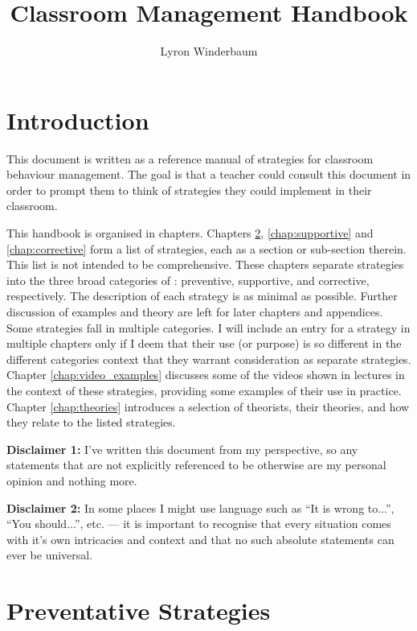 \documentclass[12pt]{report}
\title{Classroom Management Handbook}
\author{Lyron Winderbaum}
\begin{document}
\maketitle

\tableofcontents

\chapter{Introduction}

This document is written as a reference manual of strategies for classroom behaviour management. The goal is that a teacher could consult this document in order to prompt them to think of strategies they could implement in their classroom.

This handbook is organised in chapters. Chapters \ref{chap:preventative}, \ref{chap:supportive} and \ref{chap:corrective} form a list of strategies, each as a section or sub-section therein.
This list is not intended to be comprehensive. These chapters separate strategies into the three broad categories of \cite{Charles2002}: preventive, supportive, and corrective, respectively. The description of each strategy is as minimal as possible. Further discussion of examples and theory are left for later chapters and appendices. Some strategies fall in multiple categories. I will include an entry for a strategy in multiple chapters only if I deem that their use (or purpose) is so different in the different categories context that they warrant consideration as separate strategies. Chapter \ref{chap:video_examples} discusses some of the videos shown in lectures in the context of these strategies, providing some examples of their use in practice. Chapter \ref{chap:theories} introduces a selection of theorists, their theories, and how they relate to the listed strategies.

\textbf{Disclaimer 1:} I've written this document from my perspective, so any statements that are not explicitly referenced to be otherwise are my personal opinion and nothing more.

\textbf{Disclaimer 2:} In some places I might use language such as ``It is wrong to...'', ``You should...'', etc. --- it is important to recognise that every situation comes with it's own intricacies and context and that no such absolute statements can ever be universal.










\chapter{Preventative Strategies}
\label{chap:preventative}
\end{document}
